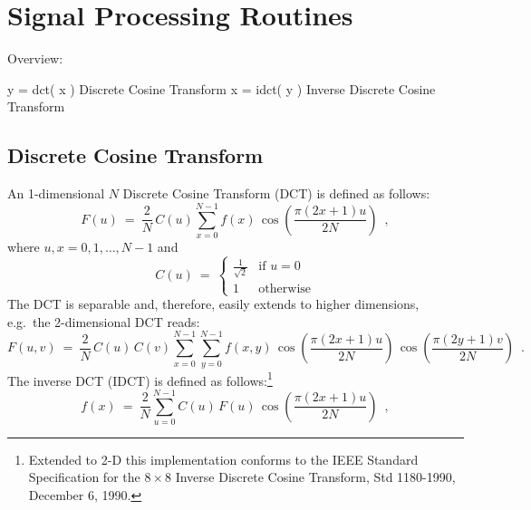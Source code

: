 	\section{Signal Processing Routines}

Overview:

\bigskip

y = dct( x )  Discrete Cosine Transform
x = idct( y ) Inverse Discrete Cosine Transform

\subsection{Discrete Cosine Transform}

An 1-dimensional $N$ Discrete Cosine Transform (DCT) is defined as follows:
\begin{equation}
  F(u) ~=~ \frac{2}{N}\, C(u) \sum_{x=0}^{N-1} f(x)\,\cos\!\left(\frac{\pi(2x+1)u}{2N}\right)\enspace,
\end{equation}
where $u,x=0,1,\dots,N-1$ and
\begin{equation}
  C(u) ~=~ \left\{\begin{array}{cl}
    \displaystyle\frac{1}{\sqrt{2}} & \mbox{if~} u=0 \\[2ex]
    1 & \mbox{otherwise}
  \end{array}\right.
\end{equation}
The DCT is separable and, therefore, easily extends to higher dimensions,
e.g.\ the 2-dimensional DCT reads:
\begin{equation}
  F(u,v) ~=~ \frac{2}{N}\, C(u)\,C(v) \sum_{x=0}^{N-1}\sum_{y=0}^{N-1} f(x,y)\,\cos\!\left(\frac{\pi(2x+1)u}{2N}\right)\,\cos\!\left(\frac{\pi(2y+1)v}{2N}\right)\enspace.
\end{equation}
The inverse DCT (IDCT) is defined as follows:\footnote{Extended to 2-D this
implementation conforms to the IEEE Standard Specification for the $8\times 8$
Inverse Discrete Cosine Transform, Std 1180-1990, December 6, 1990.}
\begin{equation}
  f(x) ~=~ \frac{2}{N} \sum_{u=0}^{N-1} C(u)\,F(u)\,\cos\!\left(\frac{\pi(2x+1)u}{2N}\right)\enspace,
\end{equation}